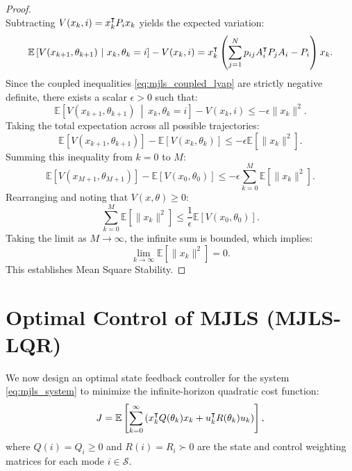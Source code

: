 \begin{proof}
\begin{equation}
\end{equation}
Subtracting $V(x_k, i) = x_k^\intercal P_i x_k$ yields the expected variation:
\begin{equation}
\mathbb{E}\left[ V(x_{k+1}, \theta_{k+1}) \ \middle| \ x_k, \theta_k = i \right] - V(x_k, i) = x_k^\trp \left( \sum_{j=1}^N p_{ij} A_i^\trp P_j A_i - P_i \right) x_k .
\end{equation}
Since the coupled inequalities \eqref{eq:mjls_coupled_lyap} are strictly negative definite, there exists a scalar $\epsilon > 0$ such that:
\begin{equation}
\mathbb{E}\left[ V(x_{k+1}, \theta_{k+1}) \ \middle| \ x_k, \theta_k = i \right] - V(x_k, i) \le -\epsilon \| x_k \|^2 .
\end{equation}
Taking the total expectation across all possible trajectories:
\begin{equation}
\mathbb{E}\left[ V(x_{k+1}, \theta_{k+1}) \right] - \mathbb{E}\left[ V(x_k, \theta_k) \right] \le -\epsilon \mathbb{E}\left[ \| x_k \|^2 \right] .
\end{equation}
Summing this inequality from $k = 0$ to $M$:
\begin{equation}
\mathbb{E}\left[ V(x_{M+1}, \theta_{M+1}) \right] - \mathbb{E}\left[ V(x_0, \theta_0) \right] \le -\epsilon \sum_{k=0}^M \mathbb{E}\left[ \| x_k \|^2 \right] .
\end{equation}
Rearranging and noting that $V(x, \theta) \ge 0$:
\begin{equation}
\sum_{k=0}^M \mathbb{E}\left[ \| x_k \|^2 \right] \le \frac{1}{\epsilon} \mathbb{E}\left[ V(x_0, \theta_0) \right] .
\end{equation}
Taking the limit as $M \to \infty$, the infinite sum is bounded, which implies:
\begin{equation}
\lim_{k \to \infty} \mathbb{E}\left[ \| x_k \|^2 \right] = 0 .
\end{equation}
This establishes Mean Square Stability.
\end{proof}

\section{Optimal Control of MJLS (MJLS-LQR)}
We now design an optimal state feedback controller for the system \eqref{eq:mjls_system} to minimize the infinite-horizon quadratic cost function:
\begin{equation}
J = \mathbb{E}\left[ \sum_{k=0}^\infty \left( x_k^\intercal Q(\theta_k) x_k + u_k^\intercal R(\theta_k) u_k \right) \right] ,
\end{equation}
where $Q(i) = Q_i \ge 0$ and $R(i) = R_i \succ 0$ are the state and control weighting matrices for each mode $i \in \mathcal{S}$.

